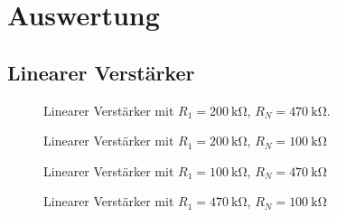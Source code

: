 \section{Auswertung}%
\label{sec:auswertung}
\subsection{Linearer Verst\"arker}

\begin{figure}[ht]
  \centering
  
  \caption{Linearer Verst\"arker mit $R_1 = \SI{200}{\kilo\ohm}$, $R_N = \SI{470}{\kilo\ohm}$.}
  \label{fig:lin_verst_01}
\end{figure}

\begin{figure}[ht]
  \centering
  
  \caption{Linearer Verst\"arker mit $R_1 = \SI{200}{\kilo\ohm}$, $R_N = \SI{100}{\kilo\ohm}$}
  \label{fig:lin_verst_02}
\end{figure}

\begin{figure}[ht]
  \centering
  
  \caption{Linearer Verst\"arker mit $R_1 = \SI{100}{\kilo\ohm}$, $R_N = \SI{470}{\kilo\ohm}$}
  \label{fig:lin_verst_03}
\end{figure}

\begin{figure}[ht]
  \centering
  
  \caption{Linearer Verst\"arker mit $R_1 = \SI{470}{\kilo\ohm}$, $R_N = \SI{100}{\kilo\ohm}$}
  \label{fig:lin_verst_04}
\end{figure}

